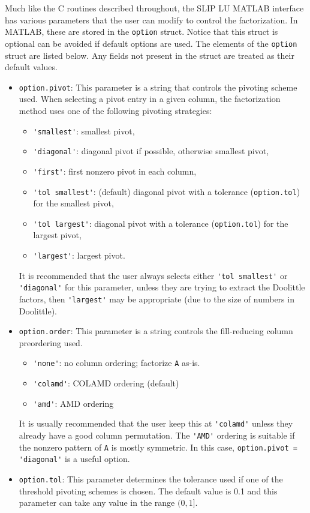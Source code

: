 \documentclass[12pt]{article}
\theoremstyle{definition}
\begin{document}
Much like the C routines described throughout, the SLIP LU MATLAB interface has
various parameters that the user can modify to control the factorization. In
MATLAB, these are stored in the \verb'option' struct.  Notice that this struct
is optional can be avoided if default options are used.  The elements of the
\verb'option' struct are listed below.  Any fields not present in the struct
are treated as their default values.

\begin{itemize}

\item \verb|option.pivot|: This parameter is a string that controls the
pivoting scheme used.  When selecting a pivot entry in a given column, the
factorization method uses one of the following pivoting strategies:

    \begin{itemize}
    \item \verb|'smallest'|: smallest pivot,
    \item \verb|'diagonal'|: diagonal pivot if possible, otherwise smallest pivot,
    \item \verb|'first'|: first nonzero pivot in each column,
    \item \verb|'tol smallest'|: (default) diagonal pivot with a tolerance (\verb|option.tol|)
        for the smallest pivot,
    \item \verb|'tol largest'|: diagonal pivot with a tolerance (\verb|option.tol|)
        for the largest pivot,
    \item \verb|'largest'|: largest pivot.
    \end{itemize}

It is recommended that the user always selects either \verb|'tol smallest'| or
\verb|'diagonal'| for this parameter, unless they are trying to extract the
Doolittle factors, then \verb|'largest'| may be appropriate (due to the size of
numbers in Doolittle).

\item \verb|option.order|: This parameter is a string controls the
fill-reducing column preordering used.

    \begin{itemize}
    \item \verb|'none'|: no column ordering; factorize \verb'A' as-is.
    \item \verb|'colamd'|: COLAMD ordering (default)
    \item \verb|'amd'|: AMD ordering
    \end{itemize}

It is usually recommended that the user keep this at \verb|'colamd'| unless
they already have a good column permutation.  The \verb|'AMD'| ordering is
suitable if the nonzero pattern of \verb'A' is mostly symmetric.  In this
case, \verb|option.pivot = 'diagonal'| is a useful option.

\item \verb|option.tol|: This parameter determines the tolerance used if one of
the threshold pivoting schemes is chosen. The default value is 0.1 and this
parameter can take any value in the range $(0,1]$.

\end{itemize}
\end{document}
